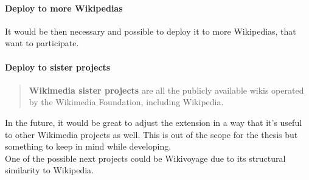 \paragraph{Deploy to more Wikipedias}
It would be then necessary and possible to deploy it to more Wikipedias, that want to participate. 

\paragraph{Deploy to sister projects}
\begin{quote}
\textbf{Wikimedia sister projects} are all the publicly available wikis operated by the Wikimedia Foundation, including Wikipedia. 
\end{quote} \citep{}
In the future, it would be great to adjust the extension in a way that it's useful to other Wikimedia projects as well. This is out of the scope for the thesis but something to keep in mind while developing. \\
One of the possible next projects could be Wikivoyage due to its structural similarity to Wikipedia.